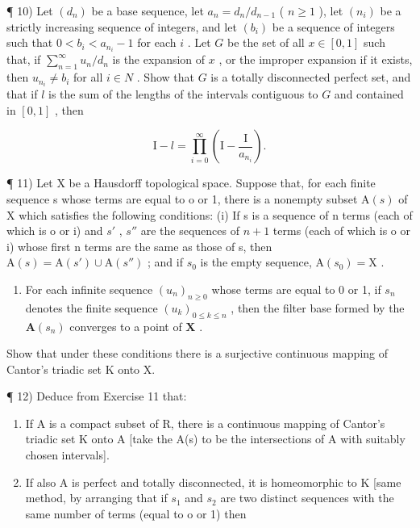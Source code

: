 ¶ 10) Let \((d_n)\) be a base sequence, let \(a_n = d_n / d_{n-1}\) ( \(n \geqslant 1\) ), let \((n_i)\) be a strictly increasing sequence of integers, and let \((b_i)\) be a sequence of integers such that \(0 < b_i < a_{n_i} - 1\) for each \(i\) . Let \(G\) be the set of all \(x \in [0, 1]\) such that, if \(\sum_{n=1}^{\infty} u_n / d_n\) is the expansion of \(x\) , or the improper expansion if it exists, then \(u_{n_i} \neq b_i\) for all \(i \in N\) . Show that \(G\) is a totally disconnected perfect set, and that if \(l\) is the sum of the lengths of the intervals contiguous to \(G\) and contained in \([0, 1]\) , then

\[
\mathrm{I} - l = \prod_ {i = 0} ^ {\infty} \left(\mathrm{I} - \frac {\mathrm{I}}{a _ {n _ {i}}}\right).
\]

¶ 11) Let X be a Hausdorff topological space. Suppose that, for each finite sequence s whose terms are equal to o or 1, there is a nonempty subset \(\mathrm{A}(s)\) of X which satisfies the following conditions: (i) If s is a sequence of n terms (each of which is o or i) and \(s'\) , \(s''\) are the sequences of \(n + 1\) terms (each of which is o or i) whose first n terms are the same as those of s, then \(\mathrm{A}(s) = \mathrm{A}(s') \cup \mathrm{A}(s'')\) ; and if \(s_0\) is the empty sequence, \(\mathrm{A}(s_0) = \mathrm{X}\) .

\begin{enumerate}
\def\labelenumi{(\roman{enumi})}
\setcounter{enumi}{1}
\tightlist
\item
  For each infinite sequence \((u_n)_{n\geqslant 0}\) whose terms are equal to 0 or 1, if \(s_n\) denotes the finite sequence \((u_k)_{0\leqslant k\leqslant n}\) , then the filter base formed by the \(\mathbf{A}(s_n)\) converges to a point of \(\mathbf{X}\) .
\end{enumerate}

Show that under these conditions there is a surjective continuous mapping of Cantor's triadic set K onto X.

¶ 12) Deduce from Exercise 11 that:

\begin{enumerate}
\def\labelenumi{\alph{enumi})}
\item
  If A is a compact subset of R, there is a continuous mapping of Cantor's triadic set K onto A {[}take the A(s) to be the intersections of A with suitably chosen intervals{]}.
\item
  If also A is perfect and totally disconnected, it is homeomorphic to K {[}same method, by arranging that if \(s_{1}\) and \(s_{2}\) are two distinct sequences with the same number of terms (equal to o or 1) then
\end{enumerate}

